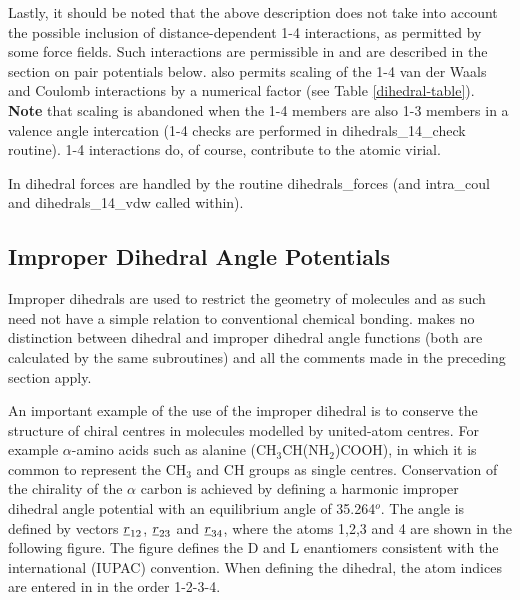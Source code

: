 Lastly, it should be noted that the above description does not
take into account the possible inclusion of distance-dependent 1-4
interactions, as permitted by some force fields.  Such interactions are permissible in \D and are described
in the section on pair potentials below.  \D also permits scaling
of the 1-4 van der Waals and Coulomb
 interactions by a numerical
factor (see Table \ref{dihedral-table}).  {\bf Note} that scaling
is abandoned when the 1-4 members are also 1-3 members in a valence
angle intercation (1-4 checks are
performed in {\sc dihedrals\_14\_check} routine).  1-4 interactions
do, of course, contribute to the atomic virial.

In \D dihedral forces are handled by the routine {\sc dihedrals\_forces}
(and {\sc intra\_coul} and {\sc dihedrals\_14\_vdw} called within).

\subsection{Improper Dihedral Angle Potentials}

Improper dihedrals are used to
restrict the geometry of molecules and as such need not have a
simple relation to conventional chemical
bonding.  \D makes no distinction between
dihedral and improper
dihedral angle functions (both
are calculated by the same subroutines) and all the comments made
in the preceding section apply.

An important example of the use of the improper
dihedral is to conserve the
structure of chiral centres in molecules modelled by united-atom
centres. For example $\alpha$-amino acids such as alanine
(CH$_{3}$CH(NH$_{2}$)COOH), in which it is common to represent the
CH$_{3}$ and CH groups as single centres.  Conservation of the
chirality of the $\alpha$ carbon is achieved by defining a
harmonic improper dihedral angle
potential with an equilibrium angle of 35.264$^{o}$.  The angle is
defined by vectors $\mbox{$\underline{r}$}_{12}$, $\mbox{$\underline{r}$}_{23}$ and
$\mbox{$\underline{r}$}_{34}$, where the atoms 1,2,3 and 4 are shown in the
following figure.  The figure defines the D and L enantiomers
consistent with the international (IUPAC) convention.  When
defining the dihedral, the atom indices
are entered in \D in the order 1-2-3-4.

